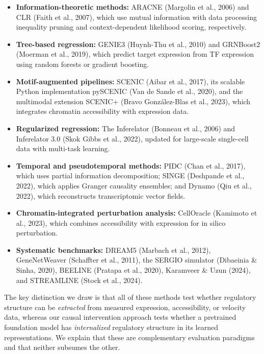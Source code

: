\documentclass[11pt,letterpaper]{article}
\begin{document}
\begin{itemize}[leftmargin=2em]
\item \textbf{Information-theoretic methods:} ARACNE (Margolin et al.,
  2006) and CLR (Faith et al., 2007), which use mutual information with
  data processing inequality pruning and context-dependent likelihood
  scoring, respectively.

\item \textbf{Tree-based regression:} GENIE3 (Huynh-Thu et al., 2010)
  and GRNBoost2 (Moerman et al., 2019), which predict target expression
  from TF expression using random forests or gradient boosting.

\item \textbf{Motif-augmented pipelines:} SCENIC (Aibar et al., 2017),
  its scalable Python implementation pySCENIC (Van de Sande et al.,
  2020), and the multimodal extension SCENIC+ (Bravo Gonz\'alez-Blas et
  al., 2023), which integrates chromatin accessibility with expression
  data.

\item \textbf{Regularized regression:} The Inferelator (Bonneau et al.,
  2006) and Inferelator 3.0 (Skok Gibbs et al., 2022), updated for
  large-scale single-cell data with multi-task learning.

\item \textbf{Temporal and pseudotemporal methods:} PIDC (Chan et al.,
  2017), which uses partial information decomposition; SINGE (Deshpande
  et al., 2022), which applies Granger causality ensembles; and Dynamo
  (Qiu et al., 2022), which reconstructs transcriptomic vector fields.

\item \textbf{Chromatin-integrated perturbation analysis:} CellOracle
  (Kamimoto et al., 2023), which combines accessibility with expression
  for in silico perturbation.

\item \textbf{Systematic benchmarks:} DREAM5 (Marbach et al., 2012),
  GeneNetWeaver (Schaffter et al., 2011), the SERGIO simulator
  (Dibaeinia \& Sinha, 2020), BEELINE (Pratapa et al., 2020),
  Karamveer \& Uzun (2024), and STREAMLINE (Stock et al., 2024).
\end{itemize}

The key distinction we draw is that all of these methods test whether
regulatory structure can be \textit{extracted} from measured expression,
accessibility, or velocity data, whereas our causal intervention approach
tests whether a pretrained foundation model has \textit{internalized}
regulatory structure in its learned representations. We explain that these
are complementary evaluation paradigms and that neither subsumes the
other.
\end{document}
